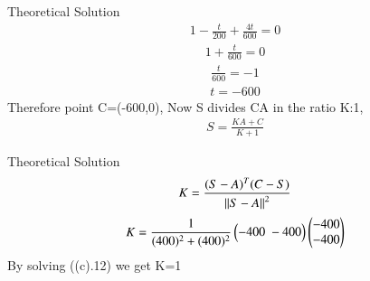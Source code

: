 \documentclass{beamer}
\begin{document}
    \begin{frame}{Theoretical Solution}
        \begin{align}
                1-\frac{t}{200}+\frac{4t}{600} = 0
            \end{align}
            \begin{align}
                1 + \frac{t}{600} = 0
            \end{align}
            \begin{align}
                \frac{t}{600}=-1
            \end{align}
            \begin{align}
                t= -600
            \end{align}
            Therefore point C=(-600,0), Now S divides CA in the ratio K:1,
            \begin{align}
                S = \frac{KA+C}{K+1}
            \end{align}
    \end{frame}
    \begin{frame}{Theoretical Solution}
            \begin{align}
                K=\frac{(S-A)^T(C-S)}{\left\lVert S-A\right\rVert^2}
            \end{align}
        \begin{align}
                K=\frac{1}{(400)^2+(400)^2}\begin{pmatrix}-400\;-400\end{pmatrix}\begin{pmatrix}-400\\-400\end{pmatrix}
            \end{align}
            By solving ((c).12) we get K=1
    \end{frame}
    
\end{document}
